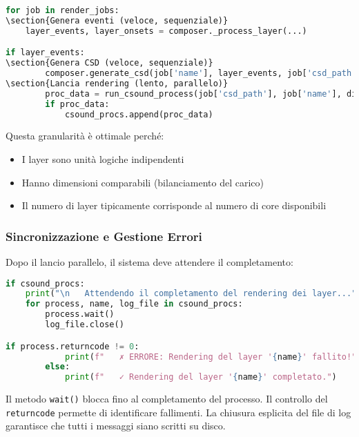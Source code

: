 \begin{lstlisting}[language=Python]
for job in render_jobs:
\section{Genera eventi (veloce, sequenziale)}
    layer_events, layer_onsets = composer._process_layer(...)

if layer_events:
\section{Genera CSD (veloce, sequenziale)}
        composer.generate_csd(job['name'], layer_events, job['csd_path'], job['wav_path'])
\section{Lancia rendering (lento, parallelo)}
        proc_data = run_csound_process(job['csd_path'], job['name'], dirs['logs'])
        if proc_data: 
            csound_procs.append(proc_data)
\end{lstlisting}

Questa granularità è ottimale perché:
\begin{itemize}
    \item I layer sono unità logiche indipendenti
    \item Hanno dimensioni comparabili (bilanciamento del carico)
    \item Il numero di layer tipicamente corrisponde al numero di core disponibili
\end{itemize}
\subsubsection{Sincronizzazione e Gestione Errori}
Dopo il lancio parallelo, il sistema deve attendere il completamento:

\begin{lstlisting}[language=Python]
if csound_procs:
    print("\n   Attendendo il completamento del rendering dei layer...")
    for process, name, log_file in csound_procs:
        process.wait()
        log_file.close()

if process.returncode != 0:
            print(f"   ✗ ERRORE: Rendering del layer '{name}' fallito!")
        else:
            print(f"   ✓ Rendering del layer '{name}' completato.")
\end{lstlisting}

Il metodo \texttt{wait()} blocca fino al completamento del processo. Il controllo del \texttt{returncode} permette di identificare fallimenti. La chiusura esplicita del file di log garantisce che tutti i messaggi siano scritti su disco.
